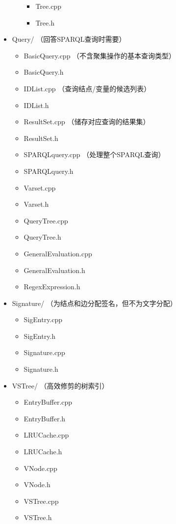 \documentclass[titlepage, a4paper, 12pt]{article}
\begin{document}
\begin{itemize}
\begin{itemize}
		\begin{itemize}
			\item
			Tree.cpp
			\item
			Tree.h
		\end{itemize}
	\end{itemize}
	\item
	Query/ （回答SPARQL查询时需要）
	
	\begin{itemize}
		\item
		BasicQuery.cpp （不含聚集操作的基本查询类型）
		\item
		BasicQuery.h
		\item
		IDList.cpp （查询结点/变量的候选列表）
		\item
		IDList.h
		\item
		ResultSet.cpp （储存对应查询的结果集）
		\item
		ResultSet.h
		\item
		SPARQLquery.cpp （处理整个SPARQL查询）
		\item
		SPARQLquery.h
		\item
		Varset.cpp
		\item
		Varset.h
		\item
		QueryTree.cpp
		\item
		QueryTree.h
		\item
		GeneralEvaluation.cpp
		\item
		GeneralEvaluation.h
		\item
		RegexExpression.h
	\end{itemize}
	\item
	Signature/ （为结点和边分配签名，但不为文字分配）
	
	\begin{itemize}
		\item
		SigEntry.cpp
		\item
		SigEntry.h
		\item
		Signature.cpp
		\item
		Signature.h
	\end{itemize}
	\item
	VSTree/ （高效修剪的树索引）
	
	\begin{itemize}
		\item
		EntryBuffer.cpp
		\item
		EntryBuffer.h
		\item
		LRUCache.cpp
		\item
		LRUCache.h
		\item
		VNode.cpp
		\item
		VNode.h
		\item
		VSTree.cpp
		\item
		VSTree.h
	\end{itemize}
\end{itemize}
\end{document}
